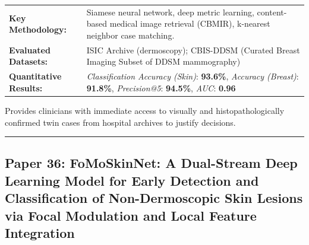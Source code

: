 \documentclass[10pt,a4paper]{article}
\begin{document}
\vspace{4pt}
\begin{tabularx}{\linewidth}{p{3.2cm}X}
\toprule
\textbf{Key Methodology:} & Siamese neural network, deep metric learning, content-based medical image retrieval (CBMIR), k-nearest neighbor case matching. \\
\textbf{Evaluated Datasets:} & ISIC Archive (dermoscopy); CBIS-DDSM (Curated Breast Imaging Subset of DDSM mammography) \\
\textbf{Quantitative Results:} & \textit{Classification Accuracy (Skin)}: \textbf{93.6\%}, \textit{Accuracy (Breast)}: \textbf{91.8\%}, \textit{Precision@5}: \textbf{94.5\%}, \textit{AUC}: \textbf{0.96} \\
\bottomrule
\end{tabularx}
\vspace{4pt}
\begin{tcolorbox}[utilitybox,title=Clinical Utility and Real-World Impact]
Provides clinicians with immediate access to visually and histopathologically confirmed twin cases from hospital archives to justify decisions.
\end{tcolorbox}
\vspace{12pt}
\hrule
\vspace{12pt}
\subsection*{Paper 36: FoMoSkinNet: A Dual-Stream Deep Learning Model for Early Detection and Classification of Non-Dermoscopic Skin Lesions via Focal Modulation and Local Feature Integration}
\end{document}
